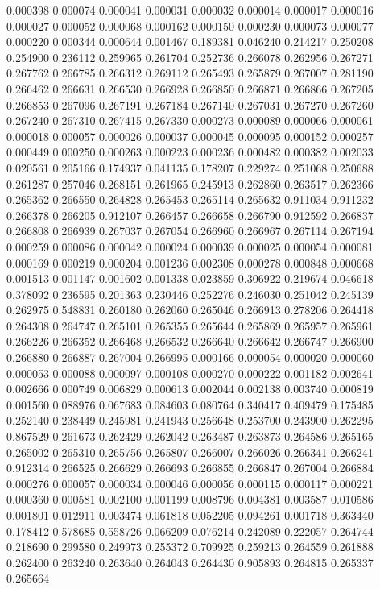 0.000398
0.000074
0.000041
0.000031
0.000032
0.000014
0.000017
0.000016
0.000027
0.000052
0.000068
0.000162
0.000150
0.000230
0.000073
0.000077
0.000220
0.000344
0.000644
0.001467
0.189381
0.046240
0.214217
0.250208
0.254900
0.236112
0.259965
0.261704
0.252736
0.266078
0.262956
0.267271
0.267762
0.266785
0.266312
0.269112
0.265493
0.265879
0.267007
0.281190
0.266462
0.266631
0.266530
0.266928
0.266850
0.266871
0.266866
0.267205
0.266853
0.267096
0.267191
0.267184
0.267140
0.267031
0.267270
0.267260
0.267240
0.267310
0.267415
0.267330
0.000273
0.000089
0.000066
0.000061
0.000018
0.000057
0.000026
0.000037
0.000045
0.000095
0.000152
0.000257
0.000449
0.000250
0.000263
0.000223
0.000236
0.000482
0.000382
0.002033
0.020561
0.205166
0.174937
0.041135
0.178207
0.229274
0.251068
0.250688
0.261287
0.257046
0.268151
0.261965
0.245913
0.262860
0.263517
0.262366
0.265362
0.266550
0.264828
0.265453
0.265114
0.265632
0.911034
0.911232
0.266378
0.266205
0.912107
0.266457
0.266658
0.266790
0.912592
0.266837
0.266808
0.266939
0.267037
0.267054
0.266960
0.266967
0.267114
0.267194
0.000259
0.000086
0.000042
0.000024
0.000039
0.000025
0.000054
0.000081
0.000169
0.000219
0.000204
0.001236
0.002308
0.000278
0.000848
0.000668
0.001513
0.001147
0.001602
0.001338
0.023859
0.306922
0.219674
0.046618
0.378092
0.236595
0.201363
0.230446
0.252276
0.246030
0.251042
0.245139
0.262975
0.548831
0.260180
0.262060
0.265046
0.266913
0.278206
0.264418
0.264308
0.264747
0.265101
0.265355
0.265644
0.265869
0.265957
0.265961
0.266226
0.266352
0.266468
0.266532
0.266640
0.266642
0.266747
0.266900
0.266880
0.266887
0.267004
0.266995
0.000166
0.000054
0.000020
0.000060
0.000053
0.000088
0.000097
0.000108
0.000270
0.000222
0.001182
0.002641
0.002666
0.000749
0.006829
0.000613
0.002044
0.002138
0.003740
0.000819
0.001560
0.088976
0.067683
0.084603
0.080764
0.340417
0.409479
0.175485
0.252140
0.238449
0.245981
0.241943
0.256648
0.253700
0.243900
0.262295
0.867529
0.261673
0.262429
0.262042
0.263487
0.263873
0.264586
0.265165
0.265002
0.265310
0.265756
0.265807
0.266007
0.266026
0.266341
0.266241
0.912314
0.266525
0.266629
0.266693
0.266855
0.266847
0.267004
0.266884
0.000276
0.000057
0.000034
0.000046
0.000056
0.000115
0.000117
0.000221
0.000360
0.000581
0.002100
0.001199
0.008796
0.004381
0.003587
0.010586
0.001801
0.012911
0.003474
0.061818
0.052205
0.094261
0.001718
0.363440
0.178412
0.578685
0.558726
0.066209
0.076214
0.242089
0.222057
0.264744
0.218690
0.299580
0.249973
0.255372
0.709925
0.259213
0.264559
0.261888
0.262400
0.263240
0.263640
0.264043
0.264430
0.905893
0.264815
0.265337
0.265664

